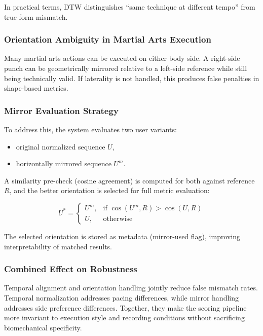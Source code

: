 \documentclass[12pt]{article}
\begin{document}
{In practical terms, DTW distinguishes ``same technique at different tempo'' from true form mismatch.

\subsubsection{Orientation Ambiguity in Martial Arts Execution}

Many martial arts actions can be executed on either body side. A right-side punch can be geometrically mirrored relative to a left-side reference while still being technically valid. If laterality is not handled, this produces false penalties in shape-based metrics.

\subsubsection{Mirror Evaluation Strategy}

To address this, the system evaluates two user variants:

\begin{itemize}
    \item original normalized sequence \(U\),
    \item horizontally mirrored sequence \(U^{m}\).
\end{itemize}

A similarity pre-check (cosine agreement) is computed for both against reference \(R\), and the better orientation is selected for full metric evaluation:

\[
U^{*}=
\begin{cases}
U^{m}, & \text{if } \cos(U^{m},R) > \cos(U,R) \\
U, & \text{otherwise}
\end{cases}
\]

The selected orientation is stored as metadata (mirror-used flag), improving interpretability of matched results.

\subsubsection{Combined Effect on Robustness}

Temporal alignment and orientation handling jointly reduce false mismatch rates. Temporal normalization addresses pacing differences, while mirror handling addresses side preference differences. Together, they make the scoring pipeline more invariant to execution style and recording conditions without sacrificing biomechanical specificity.

}
\end{document}
